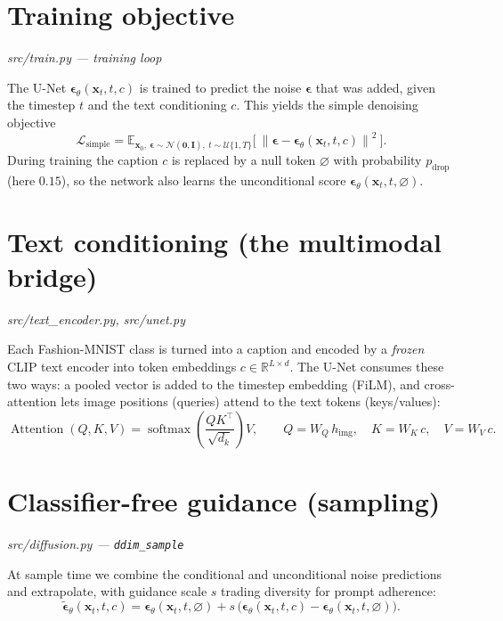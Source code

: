 \documentclass[11pt]{article}
\newcommand{\R}{\mathbb{R}}
\newcommand{\E}{\mathbb{E}}
\newcommand{\N}{\mathcal{N}}
\newcommand{\x}{\mathbf{x}}
\newcommand{\eps}{\boldsymbol{\epsilon}}
\newcommand{\epstheta}{\eps_\theta}
\newcommand{\norm}[1]{\left\lVert #1 \right\rVert}
\begin{document}
\section{Training objective}
\hfill\textit{\small src/train.py — training loop}

The U-Net $\epstheta(\x_t, t, c)$ is trained to predict the noise $\eps$ that was added, given the
timestep $t$ and the text conditioning $c$. This yields the simple denoising objective
\begin{equation}
  \boxed{\ \mathcal{L}_{\text{simple}}
  = \E_{\x_0,\ \eps \sim \N(\mathbf{0},\mathbf{I}),\ t \sim \mathcal{U}\{1,T\}}
  \Big[\ \norm{\eps - \epstheta(\x_t, t, c)}^2\ \Big].\ }
\end{equation}
During training the caption $c$ is replaced by a null token $\varnothing$ with probability
$p_{\text{drop}}$ (here $0.15$), so the network also learns the unconditional score
$\epstheta(\x_t, t, \varnothing)$.

\section{Text conditioning (the multimodal bridge)}
\hfill\textit{\small src/text\_encoder.py, src/unet.py}

Each Fashion-MNIST class is turned into a caption and encoded by a \emph{frozen} CLIP text
encoder into token embeddings $c \in \R^{L \times d}$. The U-Net consumes these two ways:
a pooled vector is added to the timestep embedding (FiLM), and cross-attention lets image
positions (queries) attend to the text tokens (keys/values):
\begin{equation}
  \operatorname{Attention}(Q, K, V) = \operatorname{softmax}\!\left( \frac{Q K^{\top}}{\sqrt{d_k}} \right) V,
  \qquad Q = W_Q\, h_{\text{img}},\quad K = W_K\, c,\quad V = W_V\, c.
\end{equation}

\section{Classifier-free guidance (sampling)}
\hfill\textit{\small src/diffusion.py — \texttt{ddim\_sample}}

At sample time we combine the conditional and unconditional noise predictions and extrapolate,
with guidance scale $s$ trading diversity for prompt adherence:
\begin{equation}
  \boxed{\ \tilde{\eps}_\theta(\x_t, t, c)
  = \epstheta(\x_t, t, \varnothing) + s\,\big( \epstheta(\x_t, t, c) - \epstheta(\x_t, t, \varnothing) \big).\ }
\end{equation}
\end{document}
